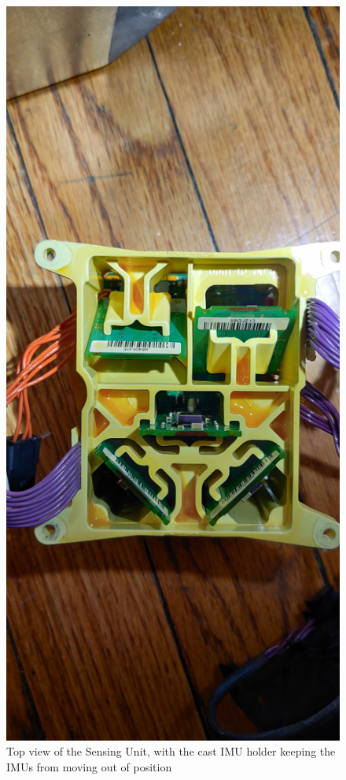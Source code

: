 \documentclass[]{formalLabReport}
\begin{document}
\begin{figure}
    \includegraphics[]{segwayGyroCubeTop.jpg}
    \caption{Top view of the Sensing Unit, with the cast IMU holder keeping the IMUs from moving out of position}
    \label{fig:segwayGyroCubeTop.jpg}
\end{figure}
\end{document}
